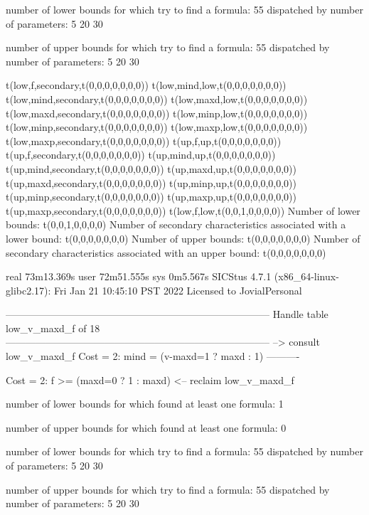 number of lower bounds for which try to find a formula: 55
dispatched by number of parameters: 5  20  30

number of upper bounds for which try to find a formula: 55
dispatched by number of parameters: 5  20  30

t(low,f,secondary,t(0,0,0,0,0,0,0))
t(low,mind,low,t(0,0,0,0,0,0,0))
t(low,mind,secondary,t(0,0,0,0,0,0,0))
t(low,maxd,low,t(0,0,0,0,0,0,0))
t(low,maxd,secondary,t(0,0,0,0,0,0,0))
t(low,minp,low,t(0,0,0,0,0,0,0))
t(low,minp,secondary,t(0,0,0,0,0,0,0))
t(low,maxp,low,t(0,0,0,0,0,0,0))
t(low,maxp,secondary,t(0,0,0,0,0,0,0))
t(up,f,up,t(0,0,0,0,0,0,0))
t(up,f,secondary,t(0,0,0,0,0,0,0))
t(up,mind,up,t(0,0,0,0,0,0,0))
t(up,mind,secondary,t(0,0,0,0,0,0,0))
t(up,maxd,up,t(0,0,0,0,0,0,0))
t(up,maxd,secondary,t(0,0,0,0,0,0,0))
t(up,minp,up,t(0,0,0,0,0,0,0))
t(up,minp,secondary,t(0,0,0,0,0,0,0))
t(up,maxp,up,t(0,0,0,0,0,0,0))
t(up,maxp,secondary,t(0,0,0,0,0,0,0))
t(low,f,low,t(0,0,1,0,0,0,0))
Number of lower bounds:                                             t(0,0,1,0,0,0,0)
Number of secondary characteristics associated with a lower bound:  t(0,0,0,0,0,0,0)
Number of upper bounds:                                             t(0,0,0,0,0,0,0)
Number of secondary characteristics associated with an upper bound: t(0,0,0,0,0,0,0)

real	73m13.369s
user	72m51.555s
sys	0m5.567s
SICStus 4.7.1 (x86_64-linux-glibc2.17): Fri Jan 21 10:45:10 PST 2022
Licensed to JovialPersonal


--------------------------------------------------------------------------------
Handle table low_v_maxd_f of 18
--------------------------------------------------------------------------------
--> consult low_v_maxd_f
Cost =  2:  mind = (v-maxd=1 ? maxd : 1)
----------

Cost =  2:  f >= (maxd=0 ? 1 : maxd)
<-- reclaim low_v_maxd_f

number of lower bounds for which found at least one formula: 1

number of upper bounds for which found at least one formula: 0

number of lower bounds for which try to find a formula: 55
dispatched by number of parameters: 5  20  30

number of upper bounds for which try to find a formula: 55
dispatched by number of parameters: 5  20  30

